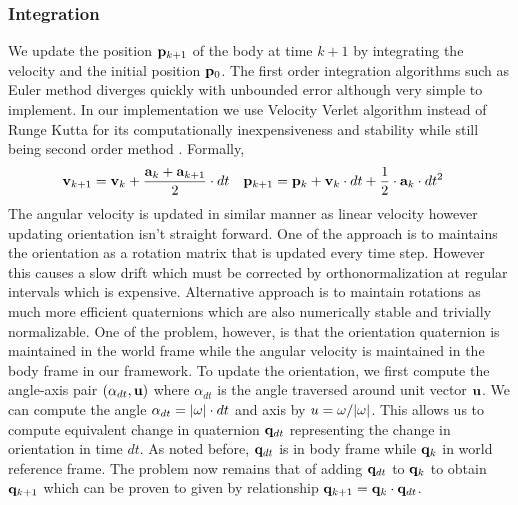 \documentclass[graybox]{svmult}
\begin{document}
\subsubsection{Integration}
We update the position ${\bf p}_{k+1}$ of the body at time $k+1$ by integrating the velocity and the initial position ${\bf p}_{0}$. The first order integration algorithms such as Euler method diverges quickly with unbounded error although very simple to implement. In our implementation we use Velocity Verlet algorithm instead of Runge Kutta for its computationally inexpensiveness and stability while still being second order method \cite{Herman2017}. Formally,
\begin{align*}
	{\bf v}_{k+1} & = {\bf v}_{k} + \frac{{\bf a}_{k} + {\bf a}_{k+1}}{2} \cdot dt                  &
	{\bf p}_{k+1} & = {\bf p}_{k} + {\bf v}_{k} \cdot dt + \frac{1}{2} \cdot {\bf a}_{k} \cdot dt^2
\end{align*}
The angular velocity is updated in similar manner as linear velocity however updating orientation isn't straight forward. One of the approach is to maintains the orientation as a rotation matrix that is updated every time step. However this causes a slow drift which must be corrected by orthonormalization at regular intervals which is expensive. Alternative approach is to maintain rotations as much more efficient quaternions which are also numerically stable and trivially normalizable. One of the problem, however, is that the orientation quaternion is maintained in the world frame while the angular velocity is maintained in the body frame in our framework. To update the orientation, we first compute the angle-axis pair $(\alpha_{dt}, {\bf u})$ where $\alpha_{dt}$ is the angle traversed around unit vector ${\bf u}$. We can compute the angle $\alpha_{dt} = |{\bf \omega}| \cdot dt$ and axis by $u = {\bf \omega} / |\omega|$. This allows us to compute equivalent change in quaternion ${\bf q}_{dt}$ representing the change in orientation in time $dt$. As noted before, ${\bf q}_{dt}$ is in body frame while ${\bf q}_{k}$ in world reference frame. The problem now remains that of adding ${\bf q}_{dt}$ to ${\bf q}_{k}$ to obtain ${\bf q}_{k+1}$ which can be proven to given by relationship ${\bf q}_{k+1} = {\bf q}_{k} \cdot {\bf q}_{dt}$.
%
%
%
%
\end{document}
